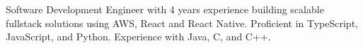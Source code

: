 \begin{cvparagraph}
Software Development Engineer with 4 years experience building scalable fullstack solutions using AWS, React and React Native. Proficient in TypeScript, JavaScript, and Python. Experience with Java, C, and C++.
\end{cvparagraph}
